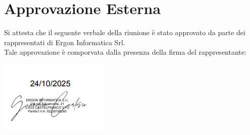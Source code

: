 \section{Approvazione Esterna}
Si attesta che il seguente verbale della riunione è stato approvato da parte dei rappresentati di Ergon Informatica Srl.\\
Tale approvazione è comporvata dalla presenza della firma del rappresentante:\\
\begin{flushright}
	\vfill
	\includegraphics{2025-10-24_firma}
\end{flushright}
